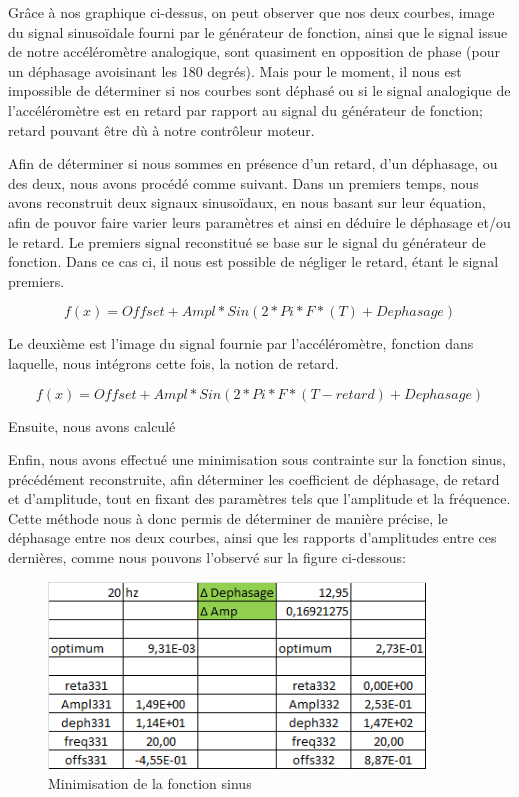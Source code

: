 \documentclass[french,a4paper,12pt]{report}
\begin{document}
 	Grâce à nos graphique ci-dessus, on peut observer que nos deux courbes, image du signal sinusoïdale fourni par le générateur de fonction, ainsi que le signal issue de notre accéléromètre analogique, sont quasiment en opposition de phase (pour un déphasage avoisinant les 180 degrés). Mais pour le moment, il nous est impossible de déterminer si nos courbes sont déphasé ou si le signal analogique de l'accéléromètre est en retard par rapport au signal du générateur de fonction; retard pouvant être dù à notre contrôleur moteur.
 	
 	Afin de déterminer si nous sommes en présence d'un retard, d'un déphasage, ou des deux, nous avons procédé comme suivant.
 	Dans un premiers temps, nous avons reconstruit deux signaux sinusoïdaux, en nous basant sur leur équation, afin de pouvor faire varier leurs paramètres et ainsi en déduire le déphasage et/ou le retard.
 	Le premiers signal reconstitué se base sur le signal du générateur de fonction. Dans ce cas ci, il nous est possible de négliger le retard, étant le signal premiers.
	
	\[	
		f(x) = Offset + Ampl * Sin( 2*Pi*F*(T) + Dephasage )
	\]	
	
	Le deuxième est l'image du signal fournie par l'accéléromètre, fonction dans laquelle, nous intégrons cette fois, la notion de retard.
	
	\[	
		f(x) = Offset + Ampl * Sin( 2*Pi*F*(T-retard) + Dephasage )
	\]
	
	Ensuite, nous avons calculé %
	
	
	Enfin, nous avons effectué une minimisation sous contrainte sur la fonction sinus, précédément reconstruite, afin déterminer les coefficient de déphasage, de retard et d'amplitude, tout en fixant des paramètres tels que l'amplitude et la fréquence. Cette méthode nous à donc permis de déterminer de manière précise, le déphasage entre nos deux courbes, ainsi que les rapports d'amplitudes entre ces dernières, comme nous pouvons l'observé sur la figure ci-dessous:
	
	\begin{figure}[!ht]
    \center
  	\includegraphics[width=10cm]{dephAmp.png}
    \caption{Minimisation de la fonction sinus}
	\end{figure}	
	
\end{document}
